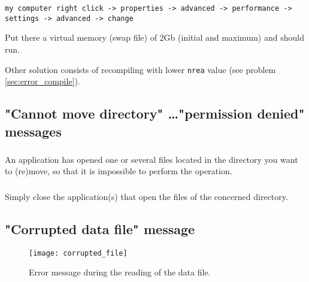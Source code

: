 \begin{verbatim}
my computer right click -> properties -> advanced -> performance -> 
settings -> advanced -> change
\end{verbatim}

Put there a virtual memory (swap file) of 2Gb (initial and maximum) and 
\diva should run. 


Other solution consists of recompiling with lower \texttt{nrea} value (see problem \ref{sec:error_compile}).



\subsection{"Cannot move directory" \ldots "permission denied" messages}



\subsubsection{\question}

An application has opened one or several files located in the directory you want to (re)move, so that it is impossible to perform the operation.

\subsubsection{\answer}

Simply close the application(s) that open the files of the concerned directory.



\subsection{"Corrupted data file" message}


\begin{figure}[htpb]
\centering
\texttt{[image: corrupted\_file]}
\caption{Error message during the reading of the data file.}
\end{figure}


